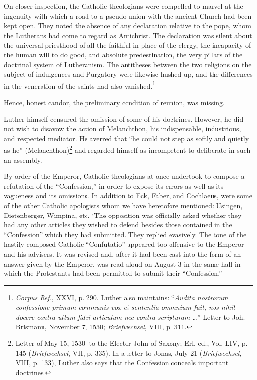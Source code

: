 On closer inspection, the Catholic theologians were compelled to
marvel at the ingenuity with which a road to a pseudo-union with the
ancient Church had been kept open. They noted the absence of any
declaration relative to the pope, whom the Lutherans had come to
regard as Antichrist. The declaration was silent about the universal
priesthood of all the faithful in place of the clergy, the incapacity
of the human will to do good, and absolute predestination, the very
pillars of the doctrinal system of Lutheranism. The antitheses between
the two religions on the subject of indulgences and Purgatory were
likewise hushed up, and the differences in the veneration of the saints
had also vanished.\footnote
{\textit{Corpus Ref.}, XXVI, p. 290. Luther also maintains: ``\textit{Audita nostrorum confessione
primum communis vox et sententia ommnium fuit, nos nihil docere contra ullum fidei
articulum nec contra scripturam \dots }'' Letter to Joh. Brismann, November 7, 1530;
\textit{Briefwechsel}, VIII, p. 311.}


Hence, honest candor, the preliminary condition of reunion, was
missing.

Luther himself censured the omission of some of his doctrines.
However, he did not wish to disavow the action of Melanchthon, his
indispensable, industrious, and respected mediator. He averred that
“he could not step as softly and quietly as he” (Melanchthon)\footnote
{Letter of May 15, 1530, to the Elector John of Saxony; Erl. ed., Vol. LIV, p. 145
(\textit{Briefwechsel}, VII, p. 335). In a letter to Jonas, July 21 (\textit{Briefwechsel}, VIII, p. 133),
Luther also says that the Confession conceals important doctrines.}
and regarded himself as incompetent to deliberate in such an assembly.

By order of the Emperor, Catholic theologians at once undertook
to compose a refutation of the “Confession,” in order to expose its
errors as well as its vagueness and its omissions. In addition to Eck,
Faber, and Cochlaeus, were some of the other Catholic apologists
whom we have heretofore mentioned: Usingen, Dietenberger, Wimpina, etc.
‘The opposition was officially asked whether they had any
other articles they wished to defend besides those contained in the
“Confession” which they had submitted. They replied evasively. The
tone of the hastily composed Catholic “Confutatio” appeared too offensive
to the Emperor and his advisers. It was revised and, after it had
been cast into the form of an answer given by the Emperor, was read
aloud on August 3 in the same hall in which the Protestants had been
permitted to submit their “Confession.”

